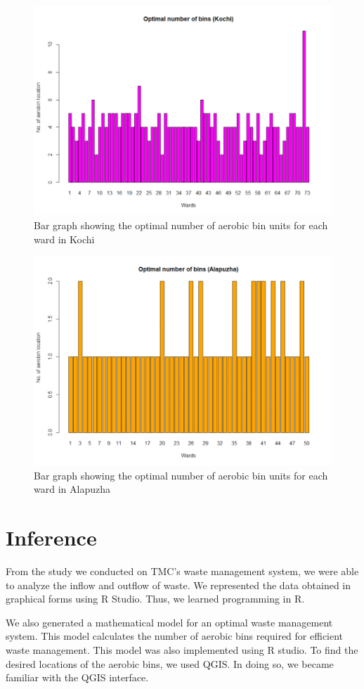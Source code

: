\documentclass[12pt,a4paper]{report}
\begin{document}
\begin{figure}[H]
	\centering
	\includegraphics[width=0.7\linewidth]{kochi}
	\caption{Bar graph showing the optimal number of aerobic bin units for each ward in Kochi}
	\label{fig:kochi}
\end{figure}

\begin{figure}[H]
	\centering
	\includegraphics[width=0.7\linewidth]{alapuzha}
	\caption{Bar graph showing the optimal number of aerobic bin units for each ward in Alapuzha}
	\label{fig:alapuzha}
\end{figure}


\chapter{\textbf{Inference}}
From the study we conducted on TMC’s waste management system, we were able to analyze the inflow and outflow of waste. We represented the data obtained in graphical forms using R Studio. Thus, we learned programming in R. 

We also generated a mathematical model for an optimal waste management system. This model calculates the number of aerobic bins required for efficient waste management. This model was also implemented using R studio. To find the desired locations of the aerobic bins, we used QGIS. In doing so, we became familiar with the QGIS interface.
\end{document}
